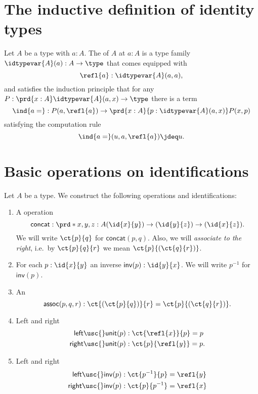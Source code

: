 \section{The inductive definition of identity types}
\begin{defn}
Let $A$ be a type with $a:A$. The  of $A$ at $a:A$ is a type family $\idtypevar{A}(a):A\to\type$ that comes equipped with
\begin{equation*}
\refl{a} : \idtypevar{A}(a,a),
\end{equation*}
and satisfies the induction principle that for any $P:\prd{x:A}\idtypevar{A}(a,x)\to\type$ there is a term
\begin{equation*}
\ind{a=} : P(a,\refl{a})\to \prd{x:A}{p:\idtypevar{A}(a,x)}P(x,p)
\end{equation*}
satisfying the computation rule
\begin{equation*}
\ind{a=}(u,a,\refl{a})\jdeq u.
\end{equation*}
\end{defn}

\section{Basic operations on identifications}\label{sec:groupoid}
\begin{defn}\label{defn:groupoid}
Let $A$ be a type. We construct the following operations and identifications:
\begin{enumerate}
\item A  operation
\begin{equation*}
\mathsf{concat} : \prd*{x,y,z:A} (\id{x}{y})\to(\id{y}{z})\to (\id{x}{z}).
\end{equation*}
We will write $\ct{p}{q}$ for $\mathsf{concat}(p,q)$. Also, we will \emph{associate to the right}, i.e.~by $\ct{p}{q}{r}$ we mean $\ct{p}{(\ct{q}{r})}$.
\item For each $p:\id{x}{y}$ an inverse $\mathsf{inv}(p):\id{y}{x}$. We will write $p^{-1}$ for $\mathsf{inv}(p)$.
\item An 
\begin{equation*}
\mathsf{assoc}(p,q,r) : \ct{(\ct{p}{q})}{r}=\ct{p}{(\ct{q}{r})}.
\end{equation*}
\item Left and right 
\begin{align*}
\mathsf{left\usc{}unit}(p) & : \ct{\refl{x}}{p}=p \\
\mathsf{right\usc{}unit}(p) & : \ct{p}{\refl{y}}=p.
\end{align*}
\item Left and right 
\begin{align*}
\mathsf{left\usc{}inv}(p) & : \ct{p^{-1}}{p} = \refl{y} \\
\mathsf{right\usc{}inv}(p) & : \ct{p}{p^{-1}} = \refl{x}
\end{align*}
\end{enumerate}
\end{defn}

